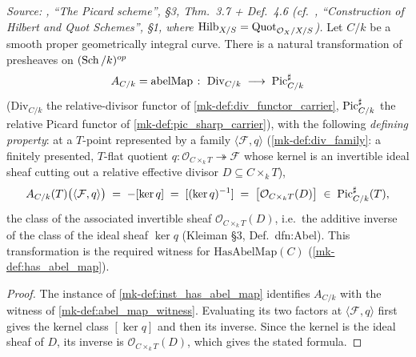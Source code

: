 \begin{lemma}\label{mk-lem:line_bundle_quot_correspondence}
  \leanok

  \textit{Source: \cite{kleiman-picard}, ``The Picard scheme'', \S 3,
  Thm.~3.7 + Def.~4.6 (cf.\ \cite{nitsure-hilbert-quot}, ``Construction of Hilbert
  and Quot Schemes'', \S 1, where \(\operatorname{Hilb}_{X/S} = \operatorname{Quot}_{\mathcal{O}_X/X/S}\)).}
  Let \(C/k\) be a smooth proper geometrically integral curve. There is a
  natural transformation of presheaves on \((\operatorname{Sch}/k)^{op}\)
  \[
    A_{C/k} = \mathrm{abelMap} \;\colon\; \mathrm{Div}_{C/k}
      \;\longrightarrow\; \operatorname{Pic}^\sharp_{C/k}
  \]
  (\(\mathrm{Div}_{C/k}\) the relative-divisor functor of
  \ref{mk-def:div_functor_carrier}, \(\operatorname{Pic}^\sharp_{C/k}\) the relative
  Picard functor of \ref{mk-def:pic_sharp_carrier}), with the following
  \emph{defining property}: at a \(T\)-point represented by a family
  \(\langle \mathcal F, q\rangle\) (\ref{mk-def:div_family}: a finitely
  presented, \(T\)-flat quotient
  \(q \colon \mathcal O_{C\times_kT}\twoheadrightarrow\mathcal F\)
  whose kernel is an invertible ideal sheaf cutting out a relative effective
  divisor \(D\subseteq C\times_kT\)),
  \[
    A_{C/k}(T)\bigl(\langle \mathcal F, q\rangle\bigr)
      \;=\; -[\ker q] \;=\; [(\ker q)^{-1}]
      \;=\; \bigl[\mathcal{O}_{C \times_k T}(D)\bigr]
      \;\in\; \operatorname{Pic}^\sharp_{C/k}(T),
  \]
  the class of the associated invertible sheaf \(\mathcal{O}_{C \times_k
  T}(D)\), i.e.\ the additive inverse of the class of the ideal sheaf
  \(\ker q\) (Kleiman \S 3, Def.~dfn:Abel). This transformation is the
  required witness for \(\mathrm{HasAbelMap}(C)\)
  (\ref{mk-def:has_abel_map}).
\end{lemma}

\begin{proof}
  The instance of \ref{mk-def:inst_has_abel_map} identifies
  \(A_{C/k}\) with the witness of \ref{mk-def:abel_map_witness}. Evaluating its
  two factors at \(\langle \mathcal F,q\rangle\) first gives the kernel class
  \([\ker q]\) and then its inverse. Since the kernel is the ideal sheaf of
  \(D\), its inverse is \(\mathcal O_{C\times_kT}(D)\), which gives the stated
  formula.
\end{proof}

